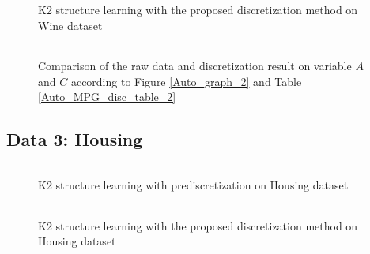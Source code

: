 \begin{figure}[ht]
    \begin{tabular}{cc}
      
    \end{tabular}
  \caption{K2 structure learning with the proposed discretization method on Wine dataset}
  \label{Wine_graph_2}
\end{figure}

\begin{figure}[ht]
    \begin{tabular}{cc}
      
    \end{tabular}
  \caption{Comparison of the raw data and discretization result on variable $A$ and $C$ according to Figure \ref{Auto_graph_2} and Table \ref{Auto_MPG_disc_table_2}}
  \label{wine_exp2_distr_5_11}
\end{figure}

\subsection{Data 3: Housing}
\label{subsec:housing}

\begin{figure}[ht]
    \begin{tabular}{cc}
      
    \end{tabular}
  \caption{K2 structure learning with prediscretization on Housing dataset}
  \label{Housing_graph_1}
\end{figure}



\begin{table}
\centering
\scalebox{1.0}{

}
\caption{Discretization result of Housing dataset based on the graph Fig. \ref{Housing_graph_1}}
\label{Housing_disc_table_1}
\end{table}

\begin{figure}[ht]
    \begin{tabular}{cc}
      
    \end{tabular}
  \caption{K2 structure learning with the proposed discretization method on Housing dataset}
  \label{Housing_graph_2}
\end{figure}


